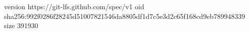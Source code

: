 version https://git-lfs.github.com/spec/v1
oid sha256:992f0286f28245d51007821546da8805df1d7c5e3d2c65f168cd9eb789948339
size 391930
